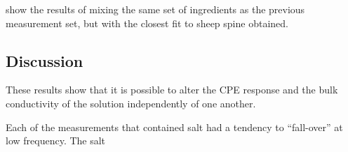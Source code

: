  show the results of mixing the same set of ingredients as the previous measurement set, but with the closest fit to sheep spine obtained.


\subsection{Discussion}

These results show that it is possible to alter the CPE response and the bulk conductivity of the solution independently of one another.

Each of the measurements that contained salt had a tendency to ``fall-over'' at low frequency.
The salt
